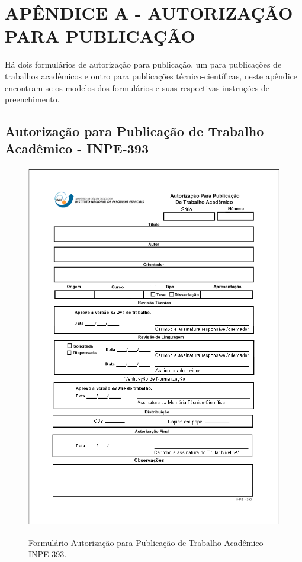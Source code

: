 \hypertarget{estilo:apendice1}{} %
\renewcommand{\thechapter}{}%
\chapter{APÊNDICE A - AUTORIZAÇÃO PARA PUBLICAÇÃO}	%
\label{apendiceA}	%
\renewcommand{\thechapter}{A}%

Há dois formulários de autorização para publicação, um para publicações de trabalhos acadêmicos e outro para publicações técnico-científicas, neste apêndice encontram-se os modelos dos formulários e suas respectivas instruções de preenchimento. 

\section{Autorização para Publicação de Trabalho Acadêmico - INPE-393}

\label{instr393}

	\begin{figure}[ht]
		\caption{Formulário Autorização para Publicação de Trabalho Acadêmico INPE-393.}
		\vspace{6mm}	%
		\centering
   		\includegraphics[height=16cm]{./Figuras/form393.png}	   
 		\label{form393}
	\end{figure}


